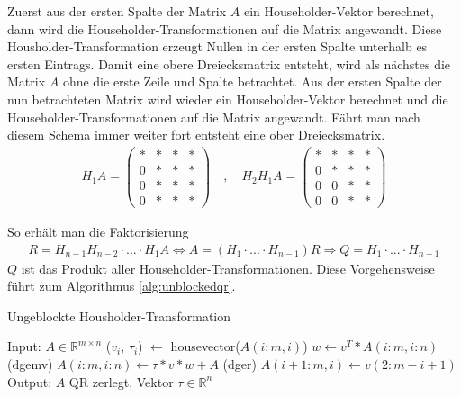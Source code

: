 Zuerst aus der ersten Spalte der Matrix $A$ ein Householder-Vektor berechnet, dann wird die  Householder-Transformationen auf die Matrix angewandt.
Diese Housholder-Transformation erzeugt Nullen in der ersten Spalte unterhalb es ersten Eintrags.
Damit eine obere Dreiecksmatrix entsteht, wird als nächstes die Matrix $A$ ohne die erste Zeile und Spalte betrachtet. Aus der ersten Spalte der nun betrachteten Matrix wird wieder ein Householder-Vektor berechnet und die Householder-Transformationen auf die Matrix angewandt.
Fährt man nach diesem Schema immer weiter fort entsteht eine ober Dreiecksmatrix.
\begin{align*}
	H_1 A= \left( 
	\begin{array}{cccc}
	* & * & * & * \\ 
	0 & * & * & * \\ 
	0 & * & * & * \\ 
	0 & * & * & *
	\end{array}
	\right)
	\quad , \quad
	H_2 H_1 A= \left( 
	\begin{array}{cccc}
	* & * & * & * \\ 
	0 & * & * & * \\ 
	0 & 0 & * & * \\ 
	0 & 0 & * & *
	\end{array}
	\right)
\end{align*} 





So erhält man die Faktorisierung
\begin{align*}
R = H_{n-1} H_{n-2}\cdot ...\cdot H_1 A \Leftrightarrow A = (H_1\cdot ...\cdot H_{n-1})R \Rightarrow Q = H_1\cdot ... \cdot H_{n-1}
\end{align*}
$Q$ ist das Produkt aller Householder-Transformationen.
Diese Vorgehensweise führt zum Algorithmus \ref{alg:unblockedqr}. 
\begin{algorithm}
	\caption{Ungeblockte Housholder-Transformation}
	\begin{algorithmic}
	\State Input: $A \in \mathbb{R}^{m \times n}$
		\State ($v_i$, $\tau_i$) $\leftarrow$ housevector($A(i:m,i)$)
		\State $w \leftarrow v^T*A(i:m,i:n)$ (dgemv)
		\State $ A(i:m,i:n) \leftarrow \tau * v * w + A $ (dger)
			\State $A(i + 1 : m, i) \leftarrow v(2 : m - i + 1)$
		\EndIf
	\EndFor	
	\State Output: $A$ QR zerlegt, Vektor $\tau \in \mathbb{R}^n$
\end{algorithmic} 
\label{alg:unblockedqr}
\end{algorithm}

